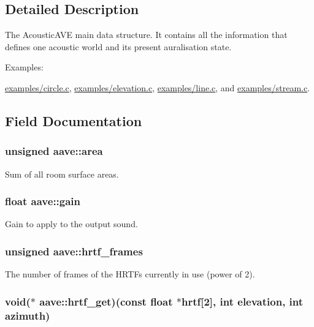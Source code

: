 \subsection{Detailed Description}
The Acoustic\-A\-V\-E main data structure. It contains all the information that defines one acoustic world and its present auralisation state. \begin{Desc}
\item[Examples\-: ]\par
\hyperlink{examples_2circle_8c-example}{examples/circle.\-c}, \hyperlink{examples_2elevation_8c-example}{examples/elevation.\-c}, \hyperlink{examples_2line_8c-example}{examples/line.\-c}, and \hyperlink{examples_2stream_8c-example}{examples/stream.\-c}.\end{Desc}


\subsection{Field Documentation}
\hypertarget{structaave_ad7a37d4250667623a1cd209b5aa421dd}{
\subsubsection[{area}]{\setlength{\rightskip}{0pt plus 5cm}unsigned aave\-::area}}\label{structaave_ad7a37d4250667623a1cd209b5aa421dd}
Sum of all room surface areas. \hypertarget{structaave_a8cb46909713b403fa7f54b75dee1e81f}{
\subsubsection[{gain}]{\setlength{\rightskip}{0pt plus 5cm}float aave\-::gain}}\label{structaave_a8cb46909713b403fa7f54b75dee1e81f}
Gain to apply to the output sound. \hypertarget{structaave_a41b7518a03a90f29e627adf308e68200}{
\subsubsection[{hrtf\-\_\-frames}]{\setlength{\rightskip}{0pt plus 5cm}unsigned aave\-::hrtf\-\_\-frames}}\label{structaave_a41b7518a03a90f29e627adf308e68200}
The number of frames of the H\-R\-T\-Fs currently in use (power of 2). \hypertarget{structaave_a5ab930083fffbd9efe3bffe51dae585b}{
\subsubsection[{hrtf\-\_\-get}]{\setlength{\rightskip}{0pt plus 5cm}void($\ast$ aave\-::hrtf\-\_\-get)(const float $\ast$hrtf\mbox{[}2\mbox{]}, int elevation, int azimuth)}}\label{structaave_a5ab930083fffbd9efe3bffe51dae585b}
